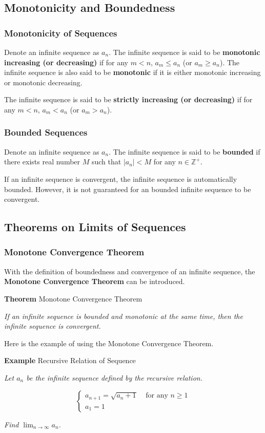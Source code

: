 \documentclass[a4paper,12pt]{article}
\newcommand{\s}{\vspace{1mm}}
\newcommand{\n}{\vspace{3mm}}
\newcommand{\Z}{\mathbb{Z}}
\newenvironment{block}[4][Block]{ %
\begin{list}{}{
  \setlength{\leftmargin}{0mm}
  \setlength{\rightmargin}{0mm}
  \setlength{\topsep}{0mm}
  \setlength{\partopsep}{0mm}
  \parsep\parskip
  \setlength{\itemsep}{-\parsep}
  }
  \needspace{\baselineskip}
  \item \textbf{#2 #3} \hspace{1mm} #4
  \vspace{1mm}
  \item
  }
{
\end{list}
}
\begin{document}
\subsection{Monotonicity and Boundedness}
\subsubsection{Monotonicity of Sequences}
Denote an infinite sequence as $a_{n}$. The infinite sequence is said to be \textbf{monotonic increasing (or decreasing)} if for any $m<n$, $a_{m}\leq a_{n}$ (or $a_{m}\geq a_{n}$). The infinite sequence is also said to be \textbf{monotonic} if it is either monotonic increasing or monotonic decreasing.\n

The infinite sequence is said to be \textbf{strictly increasing (or decreasing)} if for any $m<n$, $a_{m}<a_{n}$ (or $a_{m}>a_{n}$).

\subsubsection{Bounded Sequences}
Denote an infinite sequence as $a_{n}$. The infinite sequence is said to be \textbf{bounded} if there exists real number $M$ such that $\left| a_{n}\right| <M$ for any $n\in \Z^{+}$.\n

If an infinite sequence is convergent, the infinite sequence is automatically bounded. However, it is not guaranteed for an bounded infinite sequence to be convergent.

\subsection{Theorems on Limits of Sequences}
\subsubsection{Monotone Convergence Theorem}
With the definition of boundedness and convergence of an infinite sequence, the \textbf{Monotone Convergence Theorem} can be introduced.\n

\begin{block}{Theorem}{}{Monotone Convergence Theorem}
 \textit{If an infinite sequence is bounded and monotonic at the same time, then the infinite sequence is convergent.}
\end{block}\n

Here is the example of using the Monotone Convergence Theorem.\n

\begin{block}{Example}{}{Recursive Relation of Sequence}
  \textit{Let $a_{n}$ be the infinite sequence defined by the recursive relation.}

  $$\left\{\begin{matrix}
    a_{n+1}=\sqrt{a_{n}+1}\;\;\;\;\text{for any }n\geq 1 \\
    a_{1}=1
  \end{matrix}\right.$$\s

 \textit{Find $\lim_{n\to \infty}a_{n}$.}
\end{block}\n
\end{document}
